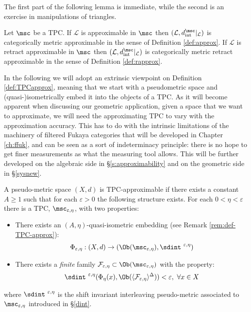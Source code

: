 The first part of the following lemma is immediate, while the second is an exercise in manipulations of triangles.
\begin{lem}
    Let $\msc$ be a TPC. If $\mathcal{L}$ is approximable in $\msc$ then $(\mathcal{L},d_{\text{int}}^\msc\vert_\mathcal{L})$ is categorically metric approximable in the sense of Definition \ref{def:approx}. If $\mathcal{L}$ is retract approximable in $\msc$ then $(\mathcal{L},d_{\text{int}}^\msc\vert_\mathcal{L})$ is categorically metric retract approximable in the sense of Definition \ref{def:rapprox}.
\end{lem}

In the following we will adopt an extrinsic viewpoint on Definition \ref{def:TPCapprox}, meaning that we start with a pseudometric space and (quasi-)isometrically embed it into the objects of a TPC. As it will become apparent when discussing our geometric application, given a space that we want to approximate, we will need the approximating TPC to vary with the approximation accuracy. This has to do with the intrinsic limitations of the machinery of filtered Fukaya categories that will be developed in Chapter \ref{ch:ffuk}, and can be seen as a sort of indeterminacy principle: there is no hope to get finer measurements as what the measuring tool allows. This will be further developed on the algebraic side in \S\ref{s:approximability} and on the geometric side in \S\ref{sysnew}.

\begin{dfn}\label{def:TPC-approx} A pseudo-metric space $(X,d)$ is TPC-approximable if there exists a constant $A\geq 1$ such that for
  each $\varepsilon >0$ the following structure exists. For each
  $0< \eta <\varepsilon$ there is a TPC, $\msc_{\varepsilon,\eta}$, with two
  properties:
  \begin{itemize}
  \item[i.] There exists an $(A,\eta)$-quasi-isometric embedding (see Remark \ref{rem:def-TPC-approx}):
    $$\Phi_{\varepsilon,\eta}:(X,d) \to (\Ob(\msc_{\varepsilon,\eta}), \sdint^{\ \varepsilon,\eta})$$
  \item[ii.] There exists a {\em finite} family
    $\mathcal{F}_{\varepsilon,\eta} \subset \Ob(\msc_{\varepsilon,\eta})$ with the
    property:
    $$\sdint^{\ \varepsilon,\eta}(\Phi_{\eta}(x), \Ob( \langle\mathcal{F}_{\varepsilon,\eta}
    \rangle ^{\Delta}) ) < \varepsilon, \ \forall x\in X$$
  \end{itemize} 
  where $\sdint^{\ \varepsilon,\eta}$ is the shift invariant interleaving pseudo-metric associated to
  $\msc_{\varepsilon,\eta}$ introduced in \S\ref{dint}.
\end{dfn}

